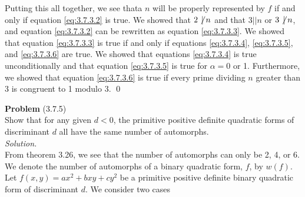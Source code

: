 \documentclass[12 pt]{amsart}
\begin{document}
  Putting this all together, we see thata
  $n$ will be properly represented by $f$ 
  if and only if
  equation \ref{eq:3.7.3.2}
  is true.
  We showed that $2 \not \, \mid n$ and that 
  $3 || n$ or $3 \not \, \mid n$, 
  and
  equation \ref{eq:3.7.3.2}
  can be rewritten as
  equation \ref{eq:3.7.3.3}.
  We showed that 
  equation \ref{eq:3.7.3.3} 
  is true if and only if 
  equations \ref{eq:3.7.3.4}, \ref{eq:3.7.3.5}, and \ref{eq:3.7.3.6}
  are true.
  We showed that 
  equations \ref{eq:3.7.3.4} is true unconditionally and that
  equation \ref{eq:3.7.3.5} is true for $\alpha = 0$ or 1.
  Furthermore, we showed that 
  equation \ref{eq:3.7.3.6} is true if 
  every prime dividing $n$ greater than 3 is congruent to 1 modulo 3.
  \qed
\vfill
\newpage



\noindent
\textbf{Problem} (3.7.5) \\[4ex]
  Show that for any given $d < 0$, the primitive
  positive definite quadratic forms of 
  discriminant $d$ all have the same number of automorphs.
  \\[2ex]
\emph{Solution.} \\[2ex]
  From theorem 3.26, we see that the number of automorphs can
  only be 2, 4, or 6.
  We denote the number of automorphs of a binary quadratic 
  form, $f$, by $w(f)$.
  Let $f(x,y) = ax^2 + bxy + cy^2$ be a 
  primitive positive definite binary quadratic form of discriminant
  $d$.
  We consider two cases
\end{document}
